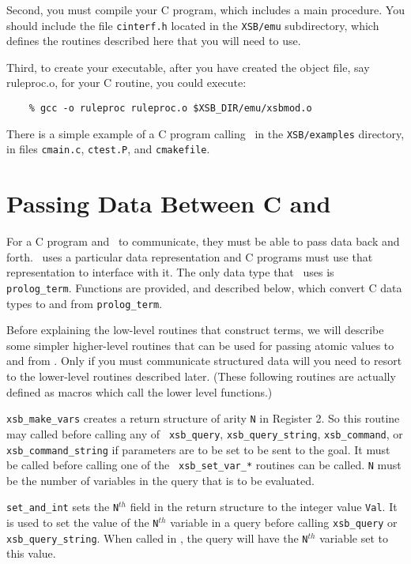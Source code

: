 {Second, you must compile your C program, which includes a main
procedure.  You should include the file {\tt cinterf.h} located in the
{\tt XSB/emu} subdirectory, which defines the routines described here
that you will need to use.

Third, to create your executable, after you have created the object
file, say ruleproc.o, for your C routine, you could execute:
\begin{verbatim}
    % gcc -o ruleproc ruleproc.o $XSB_DIR/emu/xsbmod.o
\end{verbatim}

There is a simple example of a C program calling \ourprolog\ in the
{\tt XSB/examples} directory, in files {\tt cmain.c}, {\tt ctest.P},
and {\tt cmakefile}.

\section{Passing Data Between C and \ourprolog} \label{c2p_p2p_p2c}

For a C program and \ourprolog\ to communicate, they must be able to
pass data back and forth. \ourprolog\ uses a particular data
representation and C programs must use that representation to
interface with it.  The only data type that \ourprolog\ uses is {\tt
prolog\_term}.  Functions are provided, and described below, which convert
C data types to and from {\tt prolog\_term}.

Before explaining the low-level routines that construct terms, we will
describe some simpler higher-level routines that can be used for
passing atomic values to and from \ourprolog.  Only if you must
communicate structured data will you need to resort to the lower-level
routines described later.  (These following routines are actually
defined as macros which call the lower level functions.)

\begin{description}
 
    {\tt xsb\_make\_vars} creates a return structure of arity {\tt N}
in Register 2.  So this routine may called before calling any of {\tt
xsb\_query}, {\tt xsb\_query\_string}, {\tt xsb\_command}, or {\tt
xsb\_command\_string} if parameters are to be set to be sent to the
goal.  It must be called before calling one of the {\tt
xsb\_set\_var\_*} routines can be called. {\tt N} must be the number
of variables in the query that is to be evaluated.

    {\tt set\_and\_int} sets the {\tt N}$^{th}$ field in the return
structure to the integer value {\tt Val}.  It is used to set the value of
the {\tt N}$^{th}$ variable in a query before calling {\tt xsb\_query} or
{\tt xsb\_query\_string}.  When called in \ourprolog, the query will
have the {\tt N}$^{th}$ variable set to this value.


\end{description}}
